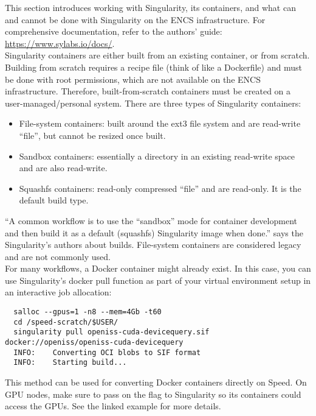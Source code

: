 This section introduces working with Singularity, its containers, and what can and cannot 
be done with Singularity on the ENCS infrastructure. For comprehensive documentation, 
refer to the authors' guide: \url{https://www.sylabs.io/docs/}.\\

Singularity containers are either built from an existing container, or from scratch. 
Building from scratch requires a recipe file (think of like a Dockerfile) and
must be done with root permissions, which are not available on the ENCS infrastructure. 
Therefore, built-from-scratch containers must be created on a user-managed/personal system. 
There are three types of Singularity containers:

\begin{itemize}
  \item File-system containers: built around the ext3 file system and are read-write ``file'', but cannot be resized once built.
  \item Sandbox containers: essentially a directory in an existing read-write space and are also read-write.
  \item Squashfs containers: read-only compressed ``file'' and are read-only. It is the default build type.
\end{itemize}

\noindent
``A common workflow is to use the ``sandbox'' mode for container development and then build it as a 
default (squashfs) Singularity image when done.'' says the Singularity's authors about builds.
File-system containers are considered legacy and are not commonly used.\\

For many workflows, a Docker container might already exist. In this case, you can use Singularity's 
docker pull function as part of your virtual environment setup in an interactive job allocation:

\small
\begin{verbatim}
  salloc --gpus=1 -n8 --mem=4Gb -t60
  cd /speed-scratch/$USER/
  singularity pull openiss-cuda-devicequery.sif docker://openiss/openiss-cuda-devicequery
  INFO:    Converting OCI blobs to SIF format
  INFO:    Starting build...
\end{verbatim}
\normalsize

\noindent
This method can be used for converting Docker containers directly on Speed.
On GPU nodes, make sure to pass on the  flag to Singularity so its containers 
could access the GPUs. See the linked example for more details.
